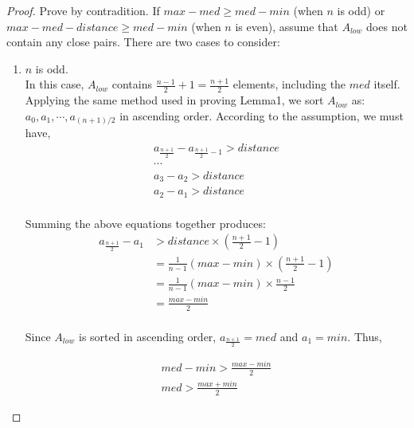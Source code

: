 \documentclass[11pt]{article}
\begin{document}
\begin{enumerate}
  \begin{proof}
    Prove by contradition.
    If $max-med \geq med-min$ (when $n$ is odd) or $max-med-distance \geq
    med-min$ (when $n$ is even), assume that $A_{low}$ does not contain
    any close pairs. There are two cases to consider:
    \begin{enumerate}
    \item $n$ is odd.\\
      In this case, $A_{low}$ contains $\frac{n-1}{2}+1=\frac{n+1}{2}$ elements,
      including the $med$ itself. Applying the same method used in
      proving Lemma1, we sort $A_{low}$ as: $a_0,
      a_1, \cdots, a_{(n+1)/2}$ in ascending order. According to the
      assumption, we must have,
      \begin{equation}
        \begin{split}
          a_{\frac{n+1}{2}} - a_{\frac{n+1}{2}-1} > distance\\
          \cdots\\
          a_3 - a_2 > distance\\
          a_2 - a_1 > distance\\
        \end{split}
      \end{equation}

      Summing the above equations together produces:
      \begin{equation}
        \begin{split}
          a_{\frac{n+1}{2}} - a_1 &> distance \times (\frac{n+1}{2}-1)\\
          & = \frac{1}{n-1} (max - min) \times (\frac{n+1}{2}-1)\\
          & = \frac{1}{n-1} (max - min) \times \frac{n-1}{2}\\
          & = \frac{max - min}{2}\\
        \end{split}
      \end{equation}

      Since $A_{low}$ is sorted in ascending order, $a_{\frac{n+1}{2}}
      = med$ and $a_1 = min$. Thus,

      \begin{equation}
        \begin{split}
          med - min > \frac{max - min}{2}\\
          med > \frac{max+min}{2}
        \end{split}
      \end{equation}


\end{enumerate}
\end{proof}
\end{enumerate}
\end{document}
